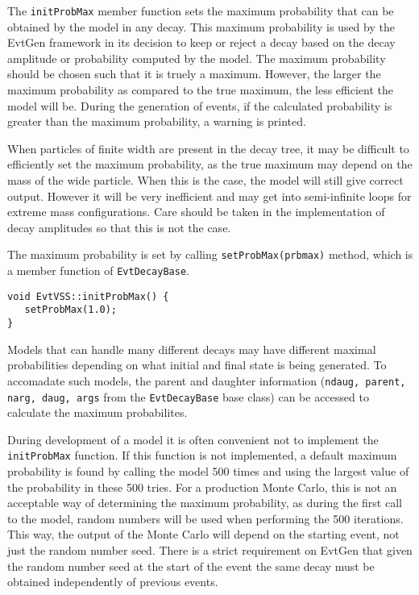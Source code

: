 The {\tt initProbMax} member function
sets the maximum probability that can be obtained by the 
model in any decay. This maximum probability is used by the EvtGen
framework in its decision to keep or reject a 
decay based on the decay amplitude
or probability computed by the model.  The maximum
probability should be chosen such that it is truely
a maximum.  However, the larger the maximum probability
as compared to the true maximum,
the less efficient the model will be.
During the generation
of events, if the calculated probability is greater than the
maximum probability, a warning is printed.  

When particles of finite width are present in the decay tree, it may be
difficult to efficiently set the maximum probability, as the true
maximum may depend on the mass of
the wide particle.  When this is the case, the model will still give
correct output. However it will be very inefficient 
and may get into semi-infinite loops for extreme mass
configurations.
Care should be taken in the implementation
of decay amplitudes so that this is not the case.  

The maximum probability is set
by calling {\tt setProbMax(prbmax)} method, which is a 
member function of {\tt EvtDecayBase}.  
\begin{footnotesize}
\begin{verbatim}
void EvtVSS::initProbMax() {
   setProbMax(1.0);
}      
\end{verbatim}
\end{footnotesize}

Models that can handle many different decays may have different 
maximal probabilities depending on what initial and final
state is being generated. To accomadate such models,
the parent and daughter 
information ({\tt ndaug, parent, narg, daug, args} from
the {\tt EvtDecayBase} base class) can be accessed to
calculate the maximum probabilites.

During development of a model it is often convenient not to 
implement the {\tt initProbMax} function. If this
function is not implemented, a default maximum probability is
found by calling the model 500 times and using
the largest value of the probability in these 500 tries.
For a production Monte Carlo, this is not an acceptable way of
determining the maximum probability, as during the first
call to the model, random numbers will
be used when performing the 500 iterations.  This way, the
output of the Monte Carlo will depend on the starting 
event, not just the random number seed.  
There is a strict requirement on EvtGen that 
given the random number seed at the
start of the event the same decay must be obtained independently
of previous events.

